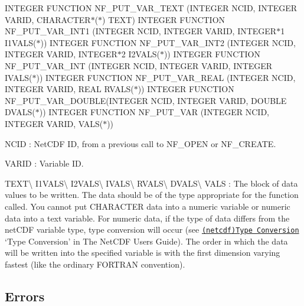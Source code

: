 I\+N\+T\+E\+G\+ER F\+U\+N\+C\+T\+I\+ON N\+F\+\_\+\+P\+U\+T\+\_\+\+V\+A\+R\+\_\+\+T\+E\+XT (I\+N\+T\+E\+G\+ER N\+C\+ID, I\+N\+T\+E\+G\+ER V\+A\+R\+ID, C\+H\+A\+R\+A\+C\+T\+E\+R$\ast$($\ast$) T\+E\+XT) I\+N\+T\+E\+G\+ER F\+U\+N\+C\+T\+I\+ON N\+F\+\_\+\+P\+U\+T\+\_\+\+V\+A\+R\+\_\+\+I\+N\+T1 (I\+N\+T\+E\+G\+ER N\+C\+ID, I\+N\+T\+E\+G\+ER V\+A\+R\+ID, I\+N\+T\+E\+G\+E\+R$\ast$1 I1\+V\+A\+L\+S($\ast$)) I\+N\+T\+E\+G\+ER F\+U\+N\+C\+T\+I\+ON N\+F\+\_\+\+P\+U\+T\+\_\+\+V\+A\+R\+\_\+\+I\+N\+T2 (I\+N\+T\+E\+G\+ER N\+C\+ID, I\+N\+T\+E\+G\+ER V\+A\+R\+ID, I\+N\+T\+E\+G\+E\+R$\ast$2 I2\+V\+A\+L\+S($\ast$)) I\+N\+T\+E\+G\+ER F\+U\+N\+C\+T\+I\+ON N\+F\+\_\+\+P\+U\+T\+\_\+\+V\+A\+R\+\_\+\+I\+NT (I\+N\+T\+E\+G\+ER N\+C\+ID, I\+N\+T\+E\+G\+ER V\+A\+R\+ID, I\+N\+T\+E\+G\+ER I\+V\+A\+L\+S($\ast$)) I\+N\+T\+E\+G\+ER F\+U\+N\+C\+T\+I\+ON N\+F\+\_\+\+P\+U\+T\+\_\+\+V\+A\+R\+\_\+\+R\+E\+AL (I\+N\+T\+E\+G\+ER N\+C\+ID, I\+N\+T\+E\+G\+ER V\+A\+R\+ID, R\+E\+AL R\+V\+A\+L\+S($\ast$)) I\+N\+T\+E\+G\+ER F\+U\+N\+C\+T\+I\+ON N\+F\+\_\+\+P\+U\+T\+\_\+\+V\+A\+R\+\_\+\+D\+O\+U\+B\+LE(I\+N\+T\+E\+G\+ER N\+C\+ID, I\+N\+T\+E\+G\+ER V\+A\+R\+ID, D\+O\+U\+B\+LE D\+V\+A\+L\+S($\ast$)) I\+N\+T\+E\+G\+ER F\+U\+N\+C\+T\+I\+ON N\+F\+\_\+\+P\+U\+T\+\_\+\+V\+AR (I\+N\+T\+E\+G\+ER N\+C\+ID, I\+N\+T\+E\+G\+ER V\+A\+R\+ID, V\+A\+L\+S($\ast$))

{\ttfamily N\+C\+ID} \+: Net\+C\+DF ID, from a previous call to N\+F\+\_\+\+O\+P\+EN or N\+F\+\_\+\+C\+R\+E\+A\+TE.

{\ttfamily V\+A\+R\+ID} \+: Variable ID.

{\ttfamily T\+E\+XT}\textbackslash{} {\ttfamily I1\+V\+A\+LS}\textbackslash{} {\ttfamily I2\+V\+A\+LS}\textbackslash{} {\ttfamily I\+V\+A\+LS}\textbackslash{} {\ttfamily R\+V\+A\+LS}\textbackslash{} {\ttfamily D\+V\+A\+LS}\textbackslash{} {\ttfamily V\+A\+LS} \+: The block of data values to be written. The data should be of the type appropriate for the function called. You cannot put C\+H\+A\+R\+A\+C\+T\+ER data into a numeric variable or numeric data into a text variable. For numeric data, if the type of data differs from the net\+C\+DF variable type, type conversion will occur (see \href{netcdf.html#Type-Conversion}{\tt (netcdf)Type Conversion} ‘\+Type Conversion’ in The Net\+C\+DF Users Guide). The order in which the data will be written into the specified variable is with the first dimension varying fastest (like the ordinary F\+O\+R\+T\+R\+AN convention).

\subsection*{Errors }

